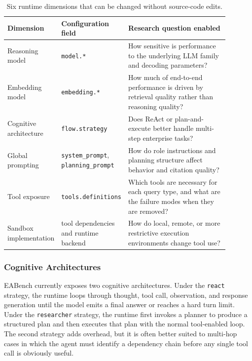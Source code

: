 \begin{table}[h]
\centering
\caption{Six runtime dimensions that can be changed without source-code edits.}
\label{tab:runtime_dimensions}
\small
\begin{tabular}{p{0.17\linewidth}p{0.24\linewidth}p{0.48\linewidth}}
\toprule
\textbf{Dimension} & \textbf{Configuration field} & \textbf{Research question enabled} \\
\midrule
Reasoning model & \texttt{model.*} & How sensitive is performance to the underlying LLM family and decoding parameters? \\
Embedding model & \texttt{embedding.*} & How much of end-to-end performance is driven by retrieval quality rather than reasoning quality? \\
Cognitive architecture & \texttt{flow.strategy} & Does ReAct or plan-and-execute better handle multi-step enterprise tasks? \\
Global prompting & \texttt{system\_prompt}, \texttt{planning\_prompt} & How do role instructions and planning structure affect behavior and citation quality? \\
Tool exposure & \texttt{tools.definitions} & Which tools are necessary for each query type, and what are the failure modes when they are removed? \\
Sandbox implementation & tool dependencies and runtime backend & How do local, remote, or more restrictive execution environments change tool use? \\
\bottomrule
\end{tabular}

\end{table}

\subsubsection{Cognitive Architectures}

EABench currently exposes two cognitive architectures. Under the \texttt{react} strategy, the runtime loops through thought, tool call, observation, and response generation until the model emits a final answer or reaches a hard turn limit. Under the \texttt{researcher} strategy, the runtime first invokes a planner to produce a structured plan and then executes that plan with the normal tool-enabled loop. The second strategy adds overhead, but it is often better suited to multi-hop cases in which the agent must identify a dependency chain before any single tool call is obviously useful.

